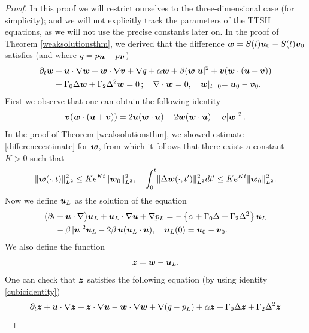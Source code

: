 \documentclass[10pt,a4paper]{amsart}
\newcommand{\Gamtwo}{\Gamma_{2}}
\newcommand{\Gamzero}{\Gamma_{0}}
\newcommand{\Rb}{\beta}
\newcommand{\bu}{\mbox{\boldmath$u$}}
\newcommand{\bv}{\mbox{\boldmath$v$}}
\newcommand{\bw}{\mbox{\boldmath$w$}}
\newcommand{\bz}{\mbox{\boldmath$z$}}
\begin{document}
\begin{proof}
In this proof we will restrict ourselves to the three-dimensional case (for simplicity); and we will not explicitly track the parameters of the TTSH equations, as we will not use the precise constants later on. In the proof of Theorem \ref{weaksolutionsthm}, we derived that the difference $\bw = S(t) \bu_0 - S(t) \bv_0$ satisfies (and where $q = p_{\small\bu} - p_{\small\bv}$)
\begin{align*}
\partial_t \bw &+ \bu \cdot \nabla \bw + \bw \cdot \nabla \bv + \nabla q + \alpha \bw + \Rb ( \bw \lvert \bu \rvert^2 + \bv ( \bw \cdot (\bu + \bv) ) \\
&+ \Gamzero \Delta \bw + \Gamtwo \Delta^2 \bw = 0\,; \quad \nabla \cdot \bw = 0, \quad \bw \lvert_{t = 0} = \bu_0 - \bv_0.
\end{align*}
First we observe that one can obtain the following identity
\begin{equation} \label{cubicidentity}
\bv ( \bw \cdot (\bu + \bv) ) = 2 \bu (\bw \cdot \bu) - 2 \bw (\bw \cdot \bu) - \bv \lvert \bw \rvert^2\,.
\end{equation}
In the proof of Theorem \ref{weaksolutionsthm}, we showed estimate \eqref{differenceestimate} for $\bw$, from which it follows that there exists a constant $K > 0$ such that
\begin{equation} \label{differencebound}
\lVert \bw (\cdot, t) \rVert_{L^2}^2 \leq K e^{K t} \lVert \bw_0 \rVert_{L^2}^2, \quad \int_0^t \lVert \Delta \bw (\cdot, t') \rVert_{L^2}^2 dt' \leq K e^{K t} \lVert \bw_0 \rVert_{L^2}^2.
\end{equation}
Now we define $\bu_L$ as the solution of the equation
\begin{align}
\big(\partial_{t} &+ \bu\cdot\nabla\big)\bu_L + \bu_L\cdot\nabla\bu + \nabla p_L
= -\left\{\alpha + \Gamzero \Delta + \Gamtwo \Delta^{2}\right\}\bu_L\nonumber\\
&- \Rb\,\lvert \bu \rvert^{2}\bu_L - 2\Rb\,\bu(\bu_L \cdot \bu ), \quad \bu_L (0) = \bu_0 - \bv_0. \nonumber
\end{align}
We also define the function
\begin{equation}
\bz = \bw - \bu_L.
\end{equation}
One can check that $\bz$ satisfies the following equation (by using identity \eqref{cubicidentity})
\begin{align*}
\partial_t \bz &+ \bu \cdot \nabla \bz + \bz \cdot \nabla \bu - \bw \cdot \nabla \bw + \nabla (q - p_L) + \alpha \bz + \Gamzero \Delta \bz + \Gamtwo \Delta^2 \bz \\

\end{align*}
\end{proof}
\end{document}
